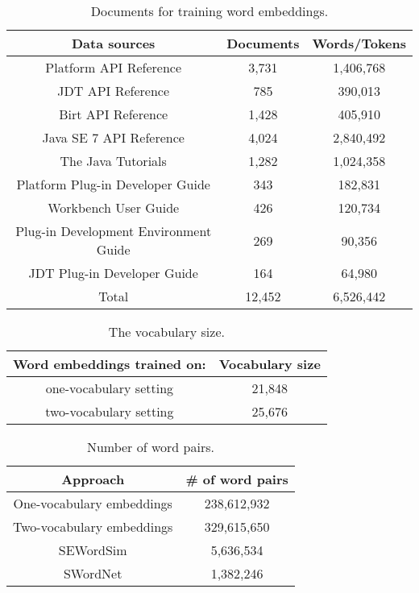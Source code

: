 \begin{table}[thbp]
\centering
\caption{Documents for training word embeddings.}
\begin{adjustbox}{width=0.47\textwidth}
\begin{tabular}{|c|c|c|} \hline
Data sources & Documents & Words/Tokens\\ \hline \hline
Platform API Reference & 3,731 & 1,406,768\\ \hline
JDT API Reference & 785 & 390,013\\ \hline
Birt API Reference & 1,428 & 405,910\\ \hline
Java SE 7 API Reference & 4,024 & 2,840,492\\ \hline
The Java Tutorials  & 1,282 & 1,024,358\\ \hline
Platform Plug-in Developer Guide & 343 & 182,831\\ \hline
Workbench User Guide & 426 & 120,734\\ \hline
Plug-in Development Environment Guide & 269 & 90,356\\ \hline
JDT Plug-in Developer Guide & 164 & 64,980\\ \hline
Total & 12,452 & 6,526,442\\ \hline
\end{tabular}
\end{adjustbox}
\label{tab:corpus}
\end{table}
\vspace*{-1em}
\begin{table}[ht!]
\centering
\caption{The vocabulary size.}
\begin{tabular}{|c|c|} \hline
Word embeddings trained on: & Vocabulary size\\ \hline
one-vocabulary setting & 21,848\\ \hline
two-vocabulary setting & 25,676\\ \hline
\end{tabular}
\label{tab:vocabulary}
\end{table}
\vspace*{-1em}
\begin{table}[ht!]
\centering
\caption{Number of word pairs.}
\begin{tabular}{|c|c|} \hline
Approach & \# of word pairs\\ \hline
One-vocabulary embeddings & 238,612,932\\ \hline
Two-vocabulary embeddings & 329,615,650\\ \hline
SEWordSim \cite{Tian:2014:SSW:2591062.2591071} & 5,636,534\\ \hline
SWordNet \cite{6224276} & 1,382,246\\ \hline
\end{tabular}
\label{tab:number of word pairs}
\end{table}

